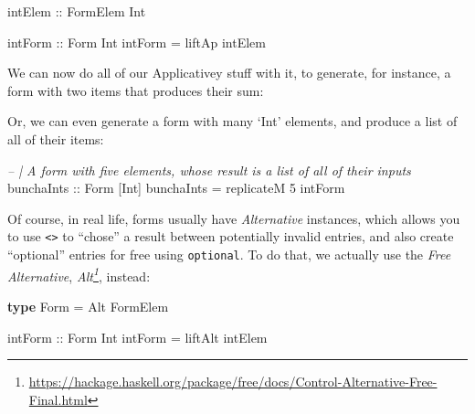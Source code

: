 \documentclass[]{article}
\newenvironment{Shaded}{}{}
\newcommand{\CommentTok}[1]{\textcolor[rgb]{0.38,0.63,0.69}{\textit{#1}}}
\newcommand{\DataTypeTok}[1]{\textcolor[rgb]{0.56,0.13,0.00}{#1}}
\newcommand{\DecValTok}[1]{\textcolor[rgb]{0.25,0.63,0.44}{#1}}
\newcommand{\FunctionTok}[1]{\textcolor[rgb]{0.02,0.16,0.49}{#1}}
\newcommand{\KeywordTok}[1]{\textcolor[rgb]{0.00,0.44,0.13}{\textbf{#1}}}
\newcommand{\NormalTok}[1]{#1}
\newcommand{\OtherTok}[1]{\textcolor[rgb]{0.00,0.44,0.13}{#1}}
\renewcommand{\href}[2]{#2\footnote{\url{#1}}}
\begin{document}
\begin{Shaded}
\begin{Highlighting}[]
\OtherTok{intElem ::} \DataTypeTok{FormElem} \DataTypeTok{Int}

\OtherTok{intForm ::} \DataTypeTok{Form} \DataTypeTok{Int}
\NormalTok{intForm }\FunctionTok{=}\NormalTok{ liftAp intElem}
\end{Highlighting}
\end{Shaded}

We can now do all of our Applicativey stuff with it, to generate, for instance,
a form with two items that produces their sum:

\begin{Shaded}
\end{Shaded}

Or, we can even generate a form with many `Int' elements, and produce a list of
all of their items:

\begin{Shaded}
\begin{Highlighting}[]
\CommentTok{-- | A form with five elements, whose result is a list of all of their inputs}
\OtherTok{bunchaInts ::} \DataTypeTok{Form}\NormalTok{ [}\DataTypeTok{Int}\NormalTok{]}
\NormalTok{bunchaInts }\FunctionTok{=}\NormalTok{ replicateM }\DecValTok{5}\NormalTok{ intForm}
\end{Highlighting}
\end{Shaded}

Of course, in real life, forms usually have \emph{Alternative} instances, which
allows you to use \texttt{\textless{}\textbar{}\textgreater{}} to ``chose'' a
result between potentially invalid entries, and also create ``optional'' entries
for free using \texttt{optional}. To do that, we actually use the \emph{Free
Alternative},
\emph{\href{https://hackage.haskell.org/package/free/docs/Control-Alternative-Free-Final.html}{Alt}},
instead:

\begin{Shaded}
\begin{Highlighting}[]
\KeywordTok{type} \DataTypeTok{Form} \FunctionTok{=} \DataTypeTok{Alt} \DataTypeTok{FormElem}

\OtherTok{intForm ::} \DataTypeTok{Form} \DataTypeTok{Int}
\NormalTok{intForm }\FunctionTok{=}\NormalTok{ liftAlt intElem}
\end{Highlighting}
\end{Shaded}
\end{document}
